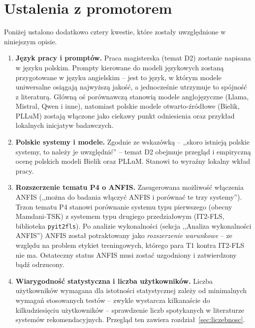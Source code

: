 \documentclass[12pt,a4paper]{article}
\begin{document}
\section{Ustalenia z promotorem}

Poniżej ustalono dodatkowo cztery kwestie, które zostały uwzględnione w niniejszym opisie.

\begin{enumerate}
\item \textbf{Język pracy i promptów.} Praca magisterska (temat D2) zostanie napisana w języku polskim. Prompty kierowane do modeli językowych zostaną przygotowane w języku angielskim -- jest to język, w którym modele uniwersalne osiągają najwyższą jakość, a jednocześnie utrzymuje to spójność z literaturą. Główną oś porównawczą stanowią modele anglojęzyczne (Llama, Mistral, Qwen i inne), natomiast polskie modele otwarto-źródłowe (Bielik, PLLuM) zostają włączone jako ciekawy punkt odniesienia oraz przykład lokalnych inicjatyw badawczych.

\item \textbf{Polskie systemy i modele.} Zgodnie ze wskazówką -- ,,skoro istnieją polskie systemy, to należy je uwzględnić'' -- temat D2 obejmuje przegląd i empiryczną ocenę polskich modeli Bielik oraz PLLuM. Stanowi to wyraźny lokalny wkład pracy.

\item \textbf{Rozszerzenie tematu P4 o ANFIS.} Zasugerowana możliwość włączenia ANFIS (,,można do badania włączyć ANFIS i porównać te trzy systemy''). Trzon tematu P4 stanowi porównanie systemu typu pierwszego (obecny Mamdani-TSK) z systemem typu drugiego przedziałowym (IT2-FLS, biblioteka \texttt{pyit2fls}). Po analizie wykonalności (sekcja ,,Analiza wykonalności ANFIS'') ANFIS został potraktowany jako \emph{rozszerzenie warunkowe} -- ze względu na problem etykiet treningowych, którego para T1 kontra IT2-FLS nie ma. Ostateczny status ANFIS musi zostać uzgodniony i zatwierdzony bądź odrzucony.

\item \textbf{Wiarygodność statystyczna i liczba użytkowników.} Liczba użytkowników wymagana dla istotności statystycznej zależy od minimalnych wymagań stosowanych testów -- zwykle wystarcza kilkanaście do kilkudziesięciu użytkowników -- sprawdzenie liczb spotykanych w literaturze systemów rekomendacyjnych. Przegląd ten zawiera rozdział~\ref{sec:liczebnosc}.
\end{enumerate}

\end{document}
